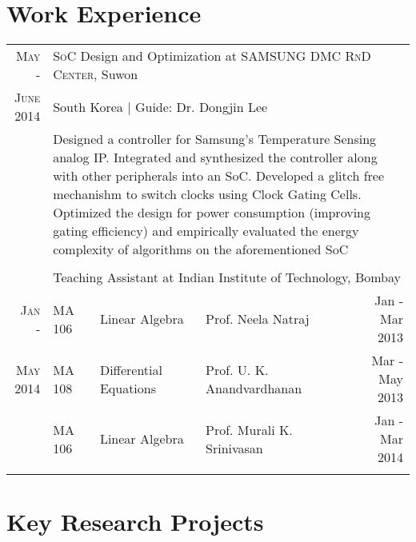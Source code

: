 \documentclass[a4paper,8pt]{article} %
\begin{document}
{\begin{tabular}{lrll}
\end{tabular}


\section{Work Experience}


\begin{tabularx}{0.95\textwidth}{r|lXXr}
\textsc{May -} & \multicolumn{4}{l}{\textsc{SoC} Design and Optimization at \textsc{SAMSUNG} \textsc{DMC RnD Center}, Suwon}\\
\textsc{June 2014} & \multicolumn{4}{l}{South Korea | \small Guide: Dr. Dongjin Lee}\\ 
& \multicolumn{4}{p{14.5cm}}{\small{Designed a controller for Samsung's Temperature Sensing analog IP. Integrated and synthesized the controller along with other peripherals into an SoC. Developed a glitch free mechanishm to switch clocks using Clock Gating Cells. Optimized the design for power consumption (improving gating efficiency) and empirically evaluated the energy complexity of algorithms on the aforementioned SoC}}\\
\multicolumn{5}{c}{} \\
& \multicolumn{4}{p{14.5cm}}{Teaching Assistant at Indian Institute of Technology, Bombay}\\
\textsc{Jan -} &\footnotesize{MA 106} & \footnotesize{Linear Algebra} & \footnotesize{Prof. Neela Natraj} & \footnotesize{Jan - Mar 2013}\\
\textsc{May 2014} &\footnotesize{MA 108} & \footnotesize{Differential Equations} & \footnotesize{Prof. U. K. Anandvardhanan} & \footnotesize{Mar - May 2013}\\
&\footnotesize{MA 106} & \footnotesize{Linear Algebra} & \footnotesize{Prof. Murali K. Srinivasan} & \footnotesize{Jan - Mar 2014}\\
\multicolumn{5}{c}{} \\
\end{tabularx}


\section{Key Research Projects}
\begin{longtable}{lr}


\end{longtable}}
\end{document}
